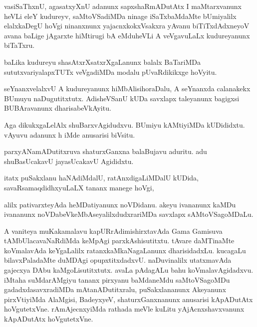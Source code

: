 \documentclass{article}
\begin{document}
\begin{mn}%
vasiSaThxnU, agasatxyXnU adanunx sapxshaRmADutAtx I maMtarxvanunx heVLi eleY kudureyv,
saMtoVSadiMDa ninage iSaTxbaMdaMte bUmiyalilx elalxkaDegU hoVgi ninanxnunx 
yajacnxkokxVsakxra yAvanu biTiTxdAdxneyoV avana baLige jAgarxte hiMtirugi bA eMduheVLi A 
veVgavuLaLx kudureyanunx biTaTxru.
\end{mn}

\begin{mn}%
baLika kudureyu shasAtxrXsatxrXgaLanunx balalx BaTariMDa sututxvariyalapxTUTx veVgadiMDa 
modalu pUvaRdikikxge hoVyitu.
\end{mn}

\begin{mn}%
seYnanxvelalxvU A kudureyanunx hiMbAlisihoraDalu, A seYnanxda calanakekx BUmuyu 
naDugutitxtutx. AdisheVSanU kUDa savxlapx taleyanunx bagigxsi BUBAravanunx dharisabeVkAyitu.
\end{mn}

\begin{mn}%
Aga dikukxgaLelAlx shuBarxvAgidudxvu. BUmiyu kAMtiyiMDa kUDididxtu. vAyuvu adanunx h iMde 
anusarisi biVsitu.
\end{mn}

\begin{mn}%
parxyANamADutitxruva shaturxGanxna balaBujavu aduritu. adu shuBasUcakavU jayasUcakavU 
Agididxtu.
\end{mn}

\begin{mn}%
itatx puSakxlanu haNAdiMdalU, ratAnxdigaLiMDalU kUDida, savaRsamaqdidhxyuLaLX tananx 
manege hoVgi,
\end{mn}

\begin{mn}%
alilx pativarxteyAda heMDatiyanunx noVDidanu. akeyu ivananunx kaMDu ivananunx 
noVDabeVkeMbAseyalilxdudxrariMDa savxlapx sAMtoVSagoMDaLu.
\end{mn}

\begin{mn}%
A vaniteya muKakamalavu kapURrAdimishirxtavAda Gama Gamisuva tAMbUlacavaNaRdiMda keMpAgi 
parxkAshisutitxtu. tAvare daMTinaMte koVmalavAda keYgaLalilx ratanxkaMkaNagaLanunx 
dharisidadxLu. kucagaLu bilavxPaladaMte duMDAgi opupxtitxdadxvU. naDuvinalilx utatxmavAda 
gajecxya DAbu kaMgoLisutitxtutx. avaLa pAdagALu bahu koVmalavAgidadxvu. iMtaha 
suMdarAMgiyu tananx pirxyanu baMdaneMdu saMtoVSagoMDu gadadxdasavxradiMDa 
mAtanADutitxralu, puSakxlananunx Akeyanunx pirxVtiyiMda AlaMgisi, BadeyxyeV, 
shaturxGanxnanunx anusarisi kApADutAtx hoVgutetxVne. rAmAjecnxyiMda rathada meVle kuLitu 
yAjAcnxshavxvanunx kApADutAtx hoVgutetxVne. 
\end{mn}
\end{document}
